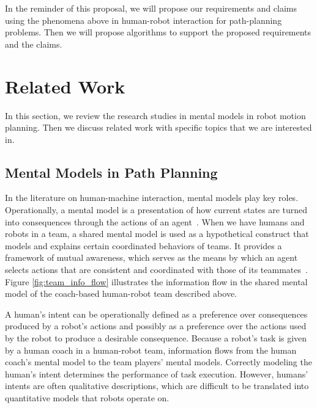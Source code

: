 \documentclass[phd]{byuprop}
\begin{document}
In the reminder of this proposal, we will propose our requirements and claims using the phenomena above in human-robot interaction for path-planning problems.
Then we will propose algorithms to support the proposed requirements and the claims.

\section{Related Work}
\label{sec:related_work}

In this section, we review the research studies in mental models in robot motion planning.
Then we discuss related work with specific topics that we are interested in.

\subsection{Mental Models in Path Planning}
\label{sec:related_work:mental_models_in_path_planning}

In the literature on human-machine interaction, mental models play key roles.
Operationally, a mental model is a presentation of how current states are turned into consequences through the actions of an agent~\cite{gray2014manipulating}.
When we have humans and robots in a team, a shared mental model is used as a hypothetical construct that models and explains certain coordinated behaviors of teams.
It provides a framework of mutual awareness, which serves as the means by which an agent selects actions that are consistent and coordinated with those of its teammates~\cite{nikolaidis2012human,Yen_implementingshared,FSS149109,Jonker:2010:SMM:2018118.2018128,Neerincx2011,Mathieu2000,Kennedy2007}.
Figure \ref{fig:team_info_flow} illustrates the information flow in the shared mental model of the coach-based human-robot team described above.

A human's intent can be operationally defined as a preference over consequences produced by a robot's actions and possibly as a preference over the actions used by the robot to produce a desirable consequence.
Because a robot's task is given by a human coach in a human-robot team, information flows from the human coach's mental model to the team players' mental models.
Correctly modeling the human's intent determines the performance of task execution.
However, humans' intents are often qualitative descriptions, which are difficult to be translated into quantitative models that robots operate on.
\end{document}
